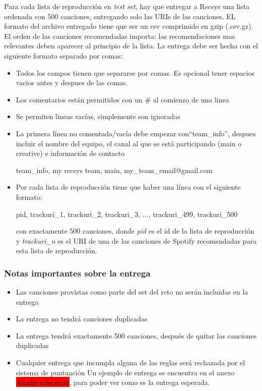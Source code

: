 \documentclass{article}
\begin{document}
	Para cada lista de reproducción en \textit{test set}, hay que entregar a Recsys una lista ordenada con 500 canciones, entregando solo las URIs de las canciones. EL formato del archivo entregado tiene que ser un csv comprimido en gzip (.csv.gz). El orden de las canciones recomendadas importa: las recomendaciones mas relevantes deben aparecer al principio de la lista. La entrega debe ser hecha con el siguiente formato separado por comas:
	\begin{itemize}
		\item Todos los campos tienen que separarse por comas. Es opcional tener espacios vacios antes y despues de las comas.
		\item Los comentarios están permitidos con un \# al comienzo de una linea
		\item Se permiten lineas vacías, simplemente son ignoradas
		\item La primera línea no comentada/vacía debe empezar con``team\_info'', despues incluir el nombre del equipo, el canal al que se está participando (main o creative) e información de contacto
			\begin{tcolorbox}
				team\_info, my recsys team, main, my\_team\_email@gmail.com
			\end{tcolorbox}
		\item Por cada lista de reproducción tiene que haber una línea con el siguiente formato:
			\begin{tcolorbox}
			pid, trackuri\_1, trackuri\_2, trackuri\_3, ..., trackuri\_499, trackuri\_500
			\end{tcolorbox}
		con exactamente 500 canciones, donde \textit{pid} es el id de la lista de reproducción y \textit{ trackuri\_n} es el URI de una de las canciones de Spotify recomendadas para esta lista de reproducción.
	\end{itemize}
	\subsubsection{Notas importantes sobre la entrega}
	\begin{itemize}
		\item Las canciones provistas como parte del set del reto no serán incluidas en la entrega
		\item La entrega no tendrá canciones duplicadas
		\item La entrega tendrá exactamente 500 canciones, después de quitar las canciones duplicadas
		\item Cualquier entrega que incumpla alguna de las reglas será rechazada por el sistema de puntuación
		Un ejemplo de entrega se encuentra en el anexo \colorbox{red}{Añadir referencia}, para poder ver como es la entrega esperada. 
	\end{itemize}
\end{document}
